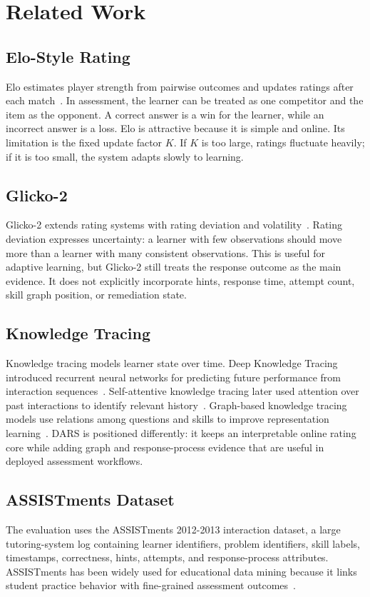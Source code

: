 \documentclass[conference]{IEEEtran}
\begin{document}
\section{Related Work}
\subsection{Elo-Style Rating}
Elo estimates player strength from pairwise outcomes and updates ratings after each match~\cite{elo}. In assessment, the learner can be treated as one competitor and the item as the opponent. A correct answer is a win for the learner, while an incorrect answer is a loss. Elo is attractive because it is simple and online. Its limitation is the fixed update factor $K$. If $K$ is too large, ratings fluctuate heavily; if it is too small, the system adapts slowly to learning.

\subsection{Glicko-2}
Glicko-2 extends rating systems with rating deviation and volatility~\cite{glickman2022glicko2}. Rating deviation expresses uncertainty: a learner with few observations should move more than a learner with many consistent observations. This is useful for adaptive learning, but Glicko-2 still treats the response outcome as the main evidence. It does not explicitly incorporate hints, response time, attempt count, skill graph position, or remediation state.

\subsection{Knowledge Tracing}
Knowledge tracing models learner state over time. Deep Knowledge Tracing introduced recurrent neural networks for predicting future performance from interaction sequences~\cite{piech2015dkt}. Self-attentive knowledge tracing later used attention over past interactions to identify relevant history~\cite{pandey2019sakt}. Graph-based knowledge tracing models use relations among questions and skills to improve representation learning~\cite{yang2020gikt}. DARS is positioned differently: it keeps an interpretable online rating core while adding graph and response-process evidence that are useful in deployed assessment workflows.

\subsection{ASSISTments Dataset}
The evaluation uses the ASSISTments 2012-2013 interaction dataset, a large tutoring-system log containing learner identifiers, problem identifiers, skill labels, timestamps, correctness, hints, attempts, and response-process attributes. ASSISTments has been widely used for educational data mining because it links student practice behavior with fine-grained assessment outcomes~\cite{heffernan2014assistments}.
\end{document}
